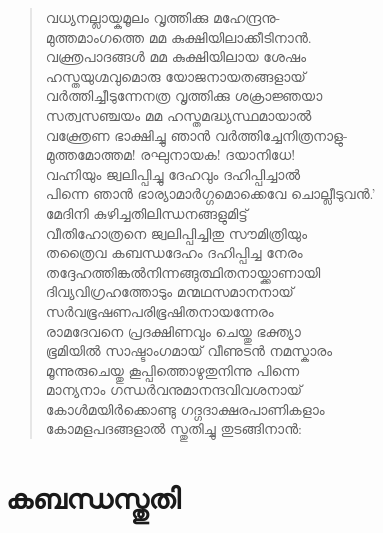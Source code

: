 \begin{verse}
വധ്യനല്ലായ്കമൂലം വൃത്തിക്കു മഹേന്ദ്രനു-\\
മുത്തമാംഗത്തെ മമ കുക്ഷിയിലാക്കീടിനാന്‍.\\
വക്ത്രപാദങ്ങള്‍ മമ കുക്ഷിയിലായ ശേഷം\\
ഹസ്തയുഗ്മവുമൊരു യോജനായതങ്ങളായ്\\
വര്‍ത്തിച്ചീടുന്നേനത്ര വൃത്തിക്കു ശക്രാജ്ഞയാ\\
സത്വസഞ്ചയം മമ ഹസ്തമദ്ധ്യസ്ഥമായാല്‍\\
വക്ത്രേണ ഭാക്ഷിച്ചു ഞാന്‍ വര്‍ത്തിച്ചേനിത്രനാളു-\\
മുത്തമോത്തമ! രഘുനായക! ദയാനിധേ!\\
വഹ്നിയും ജ്വലിപ്പിച്ചു ദേഹവും ദഹിപ്പിച്ചാല്‍\\
പിന്നെ ഞാന്‍ ഭാര്യാമാര്‍ഗ്ഗമൊക്കെവേ \hbox{ചൊല്ലീടുവന്‍.’}\\
മേദിനി കുഴിച്ചതിലിന്ധനങ്ങളുമിട്ട്\\
വീതിഹോത്രനെ ജ്വലിപ്പിച്ചിതു സൗമിത്രിയും\\
തത്രൈവ കബന്ധദേഹം ദഹിപ്പിച്ച നേരം\\
തദ്ദേഹത്തിങ്കല്‍നിന്നങ്ങുത്ഥിതനായ്ക്കാണായി\\
ദിവ്യവിഗ്രഹത്തോടും മന്മഥസമാനനായ്\\
സര്‍വഭൂഷണപരിഭൂഷിതനായന്നേരം\\
രാമദേവനെ പ്രദക്ഷിണവും ചെയ്തു ഭക്ത്യാ\\
ഭൂമിയില്‍ സാഷ്ടാംഗമായ് വീണുടന്‍ നമസ്കാരം\\
മൂന്നുരുചെയ്തു കൂപ്പിത്തൊഴുതുനിന്നു പിന്നെ\\
മാന്യനാം ഗന്ധര്‍വനുമാനന്ദവിവശനായ്\\
കോള്‍മയിര്‍ക്കൊണ്ടു ഗദ്ഗദാക്ഷരപാണികളാം\\
കോമളപദങ്ങളാല്‍ സ്തുതിച്ചു തുടങ്ങിനാന്‍:
\end{verse}

\section{കബന്ധസ്തുതി}

